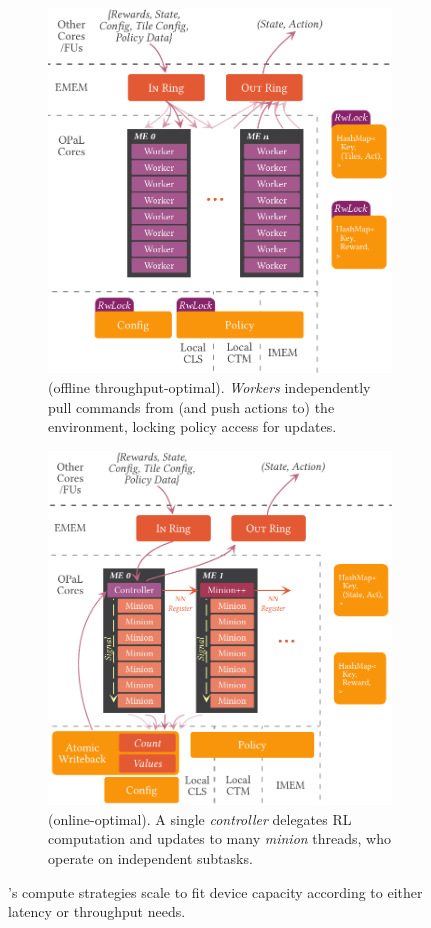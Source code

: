 \begin{figure}
	\centering
	\begin{subfigure}{\linewidth}
		\centering
		\includegraphics[keepaspectratio, width=0.78\linewidth]{diagrams/opal/ind}
		\caption{\Indfw{} (offline throughput-optimal). \emph{Workers} independently pull commands from (and push actions to) the environment, locking policy access for updates.\label{fig:single-and-parallel:single}}
	\end{subfigure}

	\begin{subfigure}{\linewidth}
		\centering
		\includegraphics[keepaspectratio, width=0.8\linewidth]{diagrams/opal/coop}
		\caption{\Coopfw{} (online-optimal). A single \emph{controller} delegates RL computation and updates to many \emph{minion} threads, who operate on independent subtasks.\label{fig:single-and-parallel:parallel}}
	\end{subfigure}
	\caption{\approachshort{}'s compute strategies scale to fit device capacity according to either latency or throughput needs.\label{fig:single-and-parallel}}
\end{figure}

